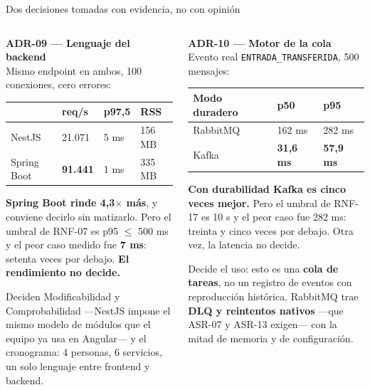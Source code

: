\documentclass[aspectratio=169,10pt,xcolor={table}]{beamer}
\begin{document}
\begin{frame}{Dos decisiones tomadas con evidencia, no con opinión}
  \scriptsize
  \begin{columns}[T]
    \begin{column}{0.5\textwidth}
      \textbf{ADR-09 --- Lenguaje del backend} \\[0.3em]
      Mismo endpoint en ambos, 100 conexiones, cero errores:
      \begin{tabular}{L{1.9cm}C{1.1cm}C{1.1cm}C{1.1cm}}
        \toprule
        & \textbf{req/s} & \textbf{p97,5} & \textbf{RSS} \\
        \midrule
        NestJS & 21.071 & 5 ms & 156 MB \\
        Spring Boot & \textbf{91.441} & 1 ms & 335 MB \\
        \bottomrule
      \end{tabular}
      \vspace{0.4em}

      \textbf{Spring Boot rinde 4,3$\times$ más}, y conviene decirlo sin matizarlo. Pero el umbral
      de RNF-07 es p95 $\leq$ 500 ms y el peor caso medido fue \textbf{7 ms}: setenta veces por
      debajo. \textbf{El rendimiento no decide.}

      Deciden Modificabilidad y Comprobabilidad ---NestJS impone el mismo modelo de módulos que
      el equipo ya usa en Angular--- y el cronograma: 4 personas, 6 servicios, un solo lenguaje
      entre frontend y backend.
    \end{column}
    \begin{column}{0.5\textwidth}
      \textbf{ADR-10 --- Motor de la cola} \\[0.3em]
      Evento real \texttt{ENTRADA\_TRANSFERIDA}, 500 mensajes:
      \begin{tabular}{L{2.2cm}C{1.3cm}C{1.3cm}}
        \toprule
        \textbf{Modo duradero} & \textbf{p50} & \textbf{p95} \\
        \midrule
        RabbitMQ & 162 ms & 282 ms \\
        Kafka & \textbf{31,6 ms} & \textbf{57,9 ms} \\
        \bottomrule
      \end{tabular}
      \vspace{0.4em}

      \textbf{Con durabilidad Kafka es cinco veces mejor.} Pero el umbral de RNF-17 es 10 s y el
      peor caso fue 282 ms: treinta y cinco veces por debajo. Otra vez, la latencia no decide.

      Decide el uso: esto es una \textbf{cola de tareas}, no un registro de eventos con
      reproducción histórica. RabbitMQ trae \textbf{DLQ y reintentos nativos} ---que ASR-07 y
      ASR-13 exigen--- con la mitad de memoria y de configuración.
    \end{column}
  \end{columns}
\end{frame}
\end{document}
